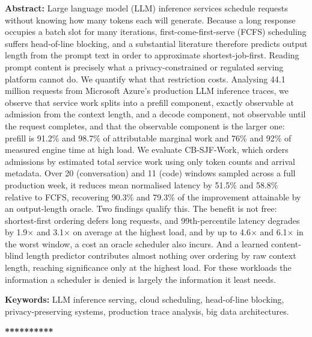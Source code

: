 \documentclass[11pt]{article}
\begin{document}
\noindent
{\bfseries Abstract:}
Large language model (LLM) inference services schedule requests without knowing how many tokens each will generate. Because a long response occupies a batch slot for many iterations, first-come-first-serve (FCFS) scheduling suffers head-of-line blocking, and a substantial literature therefore predicts output length from the prompt text in order to approximate shortest-job-first. Reading prompt content is precisely what a privacy-constrained or regulated serving platform cannot do. We quantify what that restriction costs. Analysing 44.1 million requests from Microsoft Azure's production LLM inference traces, we observe that service work splits into a prefill component, exactly observable at admission from the context length, and a decode component, not observable until the request completes, and that the observable component is the larger one: prefill is 91.2\% and 98.7\% of attributable marginal work and 76\% and 92\% of measured engine time at high load. We evaluate CB-SJF-Work, which orders admissions by estimated total service work using only token counts and arrival metadata. Over 20 (conversation) and 11 (code) windows sampled across a full production week, it reduces mean normalised latency by 51.5\% and 58.8\% relative to FCFS, recovering 90.3\% and 79.3\% of the improvement attainable by an output-length oracle. Two findings qualify this. The benefit is not free: shortest-first ordering defers long requests, and 99th-percentile latency degrades by 1.9$\times$ and 3.1$\times$ on average at the highest load, and by up to 4.6$\times$ and 6.1$\times$ in the worst window, a cost an oracle scheduler also incurs. And a learned content-blind length predictor contributes almost nothing over ordering by raw context length, reaching significance only at the highest load. For these workloads the information a scheduler is denied is largely the information it least needs.

\vspace{0.12cm}


\noindent
{\bfseries Keywords:}
LLM inference serving, cloud scheduling, head-of-line blocking, privacy-preserving systems, production trace analysis, big data architectures.

\vfill

\begin{center}
{\bfseries ***********}
\end{center}
\end{document}
